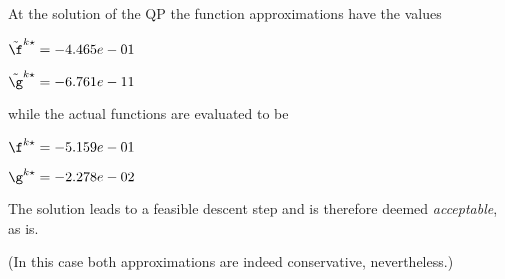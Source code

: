 At the solution of the QP the function approximations have the values

$\tilde \f^{k\star} = -4.465e-01$

$\tilde \g^{k\star} = -6.761e-11$

\bigskip
while the actual functions are evaluated to be

$\f^{k\star} = -5.159e-01$

$\g^{k\star} = -2.278e-02$

\bigskip
 The solution leads to a feasible descent step and                     is therefore deemed \emph{acceptable}, as is. 
 
(In this case both approximations are indeed conservative,                         nevertheless.)